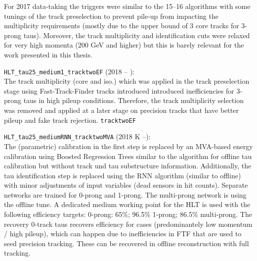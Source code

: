 For 2017 data-taking the triggers were similar to the 15--16
algorithms with some tunings of the track preselection to prevent
pile-up from impacting the multiplicity requirements (mostly due to
the upper bound of 3 core tracks for 3-prong taus). Moreover, the
track multiplicity and identification cuts were relaxed for very high
momenta (200 GeV and higher) but this is barely relevant for the work
presented in this thesis.

\vspace{1em}

\verb|HLT_tau25_medium1_tracktwoEF| (2018 -- ):\\
The track multiplicity (core and iso.) which was applied in the track
preselection stage using Fast-Track-Finder tracks introduced
introduced inefficiencies for 3-prong taus in high pileup
conditions. Therefore, the track multiplicity selection was removed
and applied at a later stage on precision tracks that have better
pileup and fake track rejection. \verb|tracktwoEF|

\vspace{1em}

\verb|HLT_tau25_mediumRNN_tracktwoMVA| (2018 K --):\\
The (parametric) calibration in the first step is replaced by an
MVA-based energy calibration using Boosted Regression Trees similar to
the algorithm for offline tau calibration but without track und tau
substructure information. Additionally, the tau identification step is
replaced using the RNN algorithm (similar to offline) with minor
adjustments of input variables (dead sensors in hit counts). Separate
networks are trained for 0-prong and 1-prong.  The multi-prong network
is using the offline tune.  A dedicated medium working point for the
HLT is used with the following efficiency targets: 0-prong: 65\%;
96.5\% 1-prong; 86.5\% multi-prong. The recovery 0-track taus recovers
efficiency for cases (predominantely low momentum / high pileup),
which can happen due to inefficiencies in FTF that are used to seed
precision tracking. These can be recovered in offline reconstruction
with full tracking.


